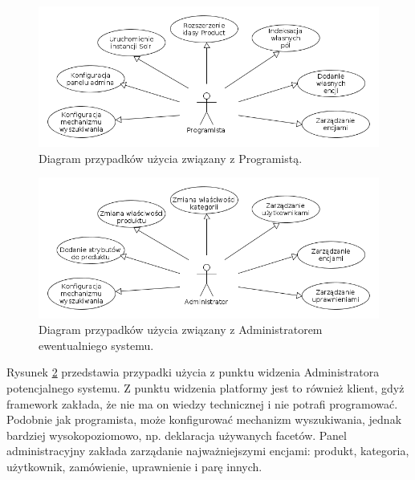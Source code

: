 \begin{figure}
\begin{center}
	\includegraphics[width=1\textwidth]{ucdev.png}
\end{center}
\caption{{\color{black}Diagram przypadków użycia związany z Programistą.}} \label{useCaseProgrammer}
\end{figure}
\begin{figure}
	\begin{center}
		\includegraphics[width=1\textwidth]{ucadmin.png}
	\end{center}
	\caption{{\color{black}Diagram przypadków użycia związany z Administratorem ewentualniego systemu.}} \label{useCaseAdmin}
\end{figure}
Rysunek \ref{useCaseAdmin} przedstawia przypadki użycia z punktu widzenia Administratora potencjalnego systemu. Z punktu widzenia platformy jest to również klient, gdyż framework zakłada, że nie ma on wiedzy technicznej i nie potrafi programować. Podobnie jak programista, może konfigurować mechanizm wyszukiwania, jednak bardziej wysokopoziomowo, np. deklaracja używanych facetów. Panel administracyjny zakłada zarządanie najważniejszymi encjami: produkt, kategoria, użytkownik, zamówienie, uprawnienie i parę innych.

